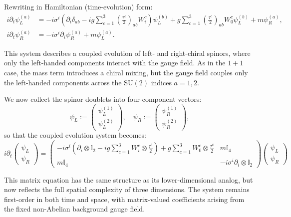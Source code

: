 \documentclass[reqno,12pt,letterpaper]{amsart}
\numberwithin{equation}{section}
\newcommand{\1}{\mathds{1}}
\theoremstyle{definition}
\begin{document}
Rewriting in Hamiltonian (time-evolution) form:
\begin{align}
	i \partial_t \psi_L^{(a)} &= -i \sigma^i \left( \partial_i \delta_{ab} - i g \sum_{c=1}^3 \left( \frac{\tau^c}{2} \right)_{ab} W_i^c \right) \psi_L^{(b)} + g \sum_{c=1}^3 \left( \frac{\tau^c}{2} \right)_{ab} W_0^c \psi_L^{(b)} + m \psi_R^{(a)}, \\
	i \partial_t \psi_R^{(a)} &= -i \sigma^i \partial_i \psi_R^{(a)} + m \psi_L^{(a)}.
\end{align}

This system describes a coupled evolution of left- and right-chiral spinors, where only the left-handed components interact with the gauge field. As in the \(1+1\) case, the mass term introduces a chiral mixing, but the gauge field couples only the left-handed components across the \(\mathrm{SU}(2)\) indices \(a = 1, 2\).

We now collect the spinor doublets into four-component vectors:
\[
\psi_L := \begin{pmatrix} \psi_L^{(1)} \\ \psi_L^{(2)} \end{pmatrix}, \quad \psi_R := \begin{pmatrix} \psi_R^{(1)} \\ \psi_R^{(2)} \end{pmatrix},
\]
so that the coupled evolution system becomes:
\[
i \partial_t \begin{pmatrix} \psi_L \\ \psi_R \end{pmatrix} =
\begin{pmatrix}
	- i \sigma^i \left( \partial_i \otimes \mathbb{I}_2 - i g \sum_{c=1}^3 W_i^c \otimes \frac{\tau^c}{2} \right) + g \sum_{c=1}^3 W_0^c \otimes \frac{\tau^c}{2}
	& m \mathbb{I}_4 \\
	m \mathbb{I}_4 & -i \sigma^i \partial_i \otimes \mathbb{I}_2
\end{pmatrix}
\begin{pmatrix} \psi_L \\ \psi_R \end{pmatrix}
\]

This matrix equation has the same structure as its lower-dimensional analog, but now reflects the full spatial complexity of three dimensions. The system remains first-order in both time and space, with matrix-valued coefficients arising from the fixed non-Abelian background gauge field.

	
	
	
\end{document}
